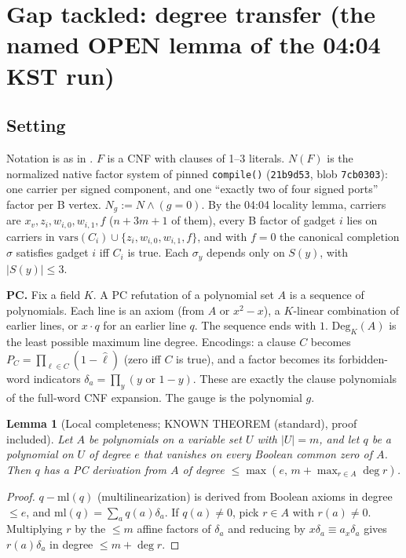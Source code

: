 \documentclass[11pt]{article}
\newtheorem{lemma}[theorem]{Lemma}
\theoremstyle{definition}
\newcommand{\Deg}{\mathrm{Deg}}
\begin{document}
\section{Gap tackled: degree transfer (the named OPEN lemma of the 04:04 KST run)}
\subsection*{Setting}
Notation is as in . $F$ is a CNF with clauses of 1--3 literals. $N(F)$ is the normalized native factor system of pinned \texttt{compile()} (\texttt{21b9d53}, blob \texttt{7cb0303}): one carrier per signed component, and one ``exactly two of four signed ports'' factor per B vertex. $N_g:=N\wedge(g=0)$. By the 04:04 locality lemma, carriers are $x_v,z_i,w_{i,0},w_{i,1},f$ ($n+3m+1$ of them), every B factor of gadget $i$ lies on carriers in $\mathrm{vars}(C_i)\cup\{z_i,w_{i,0},w_{i,1},f\}$, and with $f=0$ the canonical completion $\sigma$ satisfies gadget $i$ iff $C_i$ is true. Each $\sigma_y$ depends only on $S(y)$, with $|S(y)|\le3$.

\textbf{PC.} Fix a field $K$. A PC refutation of a polynomial set $A$ is a sequence of polynomials. Each line is an axiom (from $A$ or $x^2-x$), a $K$-linear combination of earlier lines, or $x\cdot q$ for an earlier line $q$. The sequence ends with $1$. $\Deg_K(A)$ is the least possible maximum line degree. Encodings: a clause $C$ becomes $P_C=\prod_{\ell\in C}(1-\hat\ell)$ (zero iff $C$ is true), and a factor becomes its forbidden-word indicators $\delta_a=\prod_{y}(y\text{ or }1-y)$. These are exactly the clause polynomials of the full-word CNF expansion. The gauge is the polynomial $g$.

\begin{lemma}[Local completeness; KNOWN THEOREM (standard), proof included]\label{lem:lc}
Let $A$ be polynomials on a variable set $U$ with $|U|=m$, and let $q$ be a polynomial on $U$ of degree $e$ that vanishes on every Boolean common zero of $A$. Then $q$ has a PC derivation from $A$ of degree $\le\max(e,\,m+\max_{r\in A}\deg r)$.
\end{lemma}
\begin{proof}
$q-\mathrm{ml}(q)$ (multilinearization) is derived from Boolean axioms in degree $\le e$, and $\mathrm{ml}(q)=\sum_a q(a)\delta_a$. If $q(a)\ne0$, pick $r\in A$ with $r(a)\neq0$. Multiplying $r$ by the $\le m$ affine factors of $\delta_a$ and reducing by $x\delta_a\equiv a_x\delta_a$ gives $r(a)\delta_a$ in degree $\le m+\deg r$.
\end{proof}
\end{document}
